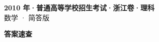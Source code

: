 \documentclass[zihao=-4, a4paper]{ctexart}
\begin{document}
\begin{center}
  {\Large\bfseries 2010 年·普通高等学校招生考试·浙江卷·理科}\\[4pt]
  {\large 数学 · 简答版}
\end{center}
\medskip
{}

\clearpage
{}
\begin{center}{\Large\bfseries 答案速查}\end{center}
\medskip

\end{document}
